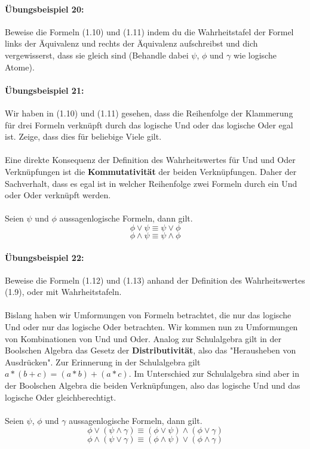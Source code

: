 \documentclass[11pt,a4paper,leqno]{report}
\numberwithin{equation}{chapter}
\begin{document}
\paragraph{Übungsbeispiel 20:} Beweise die Formeln (1.10) und (1.11) indem du die Wahrheitstafel der Formel links der Äquivalenz und rechts der Äquivalenz aufschreibst und dich vergewisserst, dass sie gleich sind (Behandle dabei $\psi$, $\phi$ und $\gamma$ wie logische Atome).

\paragraph{Übungsbeispiel 21:} Wir haben in (1.10) und (1.11) gesehen, dass die Reihenfolge der Klammerung für drei Formeln verknüpft durch das logische Und oder das logische Oder egal ist. Zeige, dass dies für beliebige Viele gilt.\\
\\
Eine direkte Konsequenz der Definition des Wahrheitswertes für Und und Oder Verknüpfungen ist die \textbf{Kommutativität} der beiden Verknüpfungen. Daher der Sachverhalt, dass es egal ist in welcher Reihenfolge zwei Formeln durch ein Und oder Oder verknüpft werden.\\
\\
Seien $\psi$ und $\phi$ aussagenlogische Formeln, dann gilt.
\begin{equation}
\phi \vee \psi \equiv  \psi\vee \phi
\end{equation}
\begin{equation}
\phi \wedge \psi \equiv  \psi\wedge \phi
\end{equation}
\paragraph{Übungsbeispiel 22:} Beweise die Formeln (1.12) und (1.13) anhand der Definition des Wahrheitswertes (1.9), oder mit Wahrheitstafeln.\\
\\
Bislang haben wir Umformungen von Formeln betrachtet, die nur das logische Und oder nur das logische Oder betrachten. Wir kommen nun zu Umformungen von Kombinationen von Und und Oder. Analog zur Schulalgebra gilt in der Boolschen Algebra das Gesetz der \textbf{Distributivität}, also das "Herausheben von Ausdrücken". Zur Erinnerung in der Schulalgebra gilt $a*(b + c) = (a*b) + (a*c)$. Im Unterschied zur Schulalgebra sind aber in der Boolschen Algebra die beiden Verknüpfungen, also das logische Und und das logische Oder gleichberechtigt. \\
\\
Seien $\psi$, $\phi$ und $\gamma$ aussagenlogische Formeln, dann gilt.
\begin{equation}
\phi \vee (\psi\wedge\gamma) \equiv (\phi \vee \psi)\wedge(\phi \vee \gamma)
\end{equation}
\begin{equation}
\phi \wedge (\psi\vee\gamma) \equiv (\phi \wedge \psi)\vee(\phi \wedge \gamma)
\end{equation}
\end{document}

